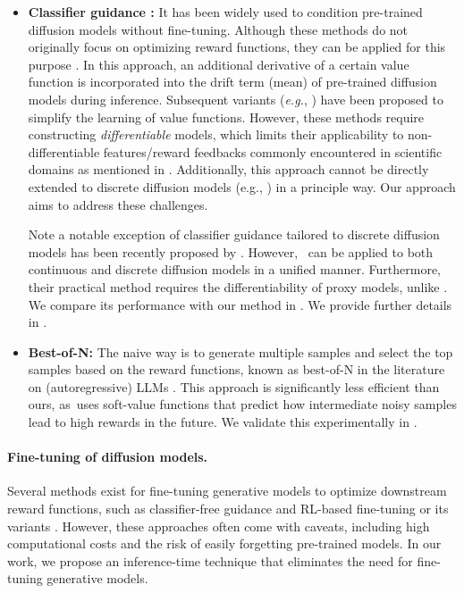 \begin{itemize}[leftmargin=*]
\item \textbf{Classifier guidance \citep{dhariwal2021diffusion,song2020denoising}:} It has been widely used to condition pre-trained diffusion models without fine-tuning. Although these methods do not originally focus on optimizing reward functions, they can be applied for this purpose  \citep[Section 6.2]{uehara2024understanding}. In this approach, an additional derivative of a certain value function is incorporated into the drift term (mean) of pre-trained diffusion models during inference. Subsequent variants (\textit{e.g.}, \citet{chung2022diffusion,ho2022video,bansal2023universal,guo2024gradient,wang2022zero,yu2023freedom}) have been proposed to simplify the learning of value functions. However, these methods require constructing \emph{differentiable} models, which limits their applicability to non-differentiable features/reward feedbacks commonly encountered in scientific domains as mentioned in . Additionally, this approach cannot be directly extended to discrete diffusion models (e.g., \citep{lou2023discrete,shi2024simplified,sahoo2024simple}) in a principle way. 
Our approach aims to address these challenges.

Note a notable exception of classifier guidance tailored to discrete diffusion models has been recently proposed by \citet{nisonoff2024unlocking}. However, \alg\ can be applied to both continuous and discrete diffusion models in a unified manner. Furthermore, their practical method requires the differentiability of proxy models, unlike \alg.  We compare its performance with our method in . We provide further details in . 


\vspace{-1mm}
\item \textbf{Best-of-N:} The naive way is to generate multiple samples and select the top samples based on the reward functions, known as best-of-N in the literature on (autoregressive) LLMs \citep{stiennon2020learning,nakano2021webgpt,touvron2023llama,beirami2024theoretical,gao2023scaling}. This approach is significantly less efficient than ours, as \alg\,uses soft-value functions that predict how intermediate noisy samples lead to high rewards in the future. We validate this experimentally in .
\end{itemize}

\vspace{-2mm}
\paragraph{Fine-tuning of diffusion models.} Several methods exist for fine-tuning generative models to optimize downstream reward functions, such as classifier-free guidance \citep{ho2022classifier} and RL-based fine-tuning \citep{fan2023dpok, black2023training} or its variants \citep{dong2023raft,wallace2024diffusion}. However, these approaches often come with caveats, including high computational costs and the risk of easily forgetting pre-trained models. In our work, we propose an inference-time technique that eliminates the need for fine-tuning generative models.%

